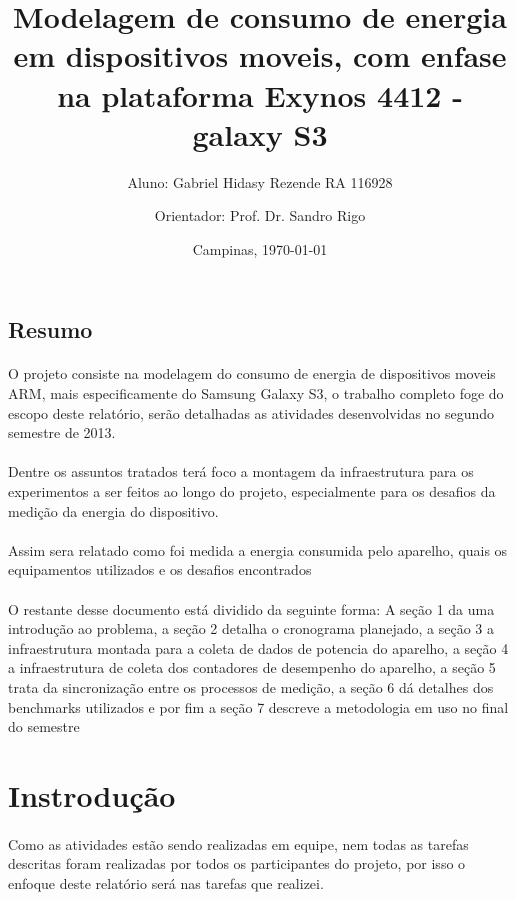 \documentclass[11pt,a4paper,titlepage]{article}
\title{Modelagem de consumo de energia em dispositivos moveis, com enfase na plataforma Exynos 4412 - galaxy S3}
\author{Aluno: Gabriel Hidasy Rezende RA 116928 \and Orientador: Prof. Dr. Sandro Rigo}
\date{Campinas, \today}
\begin{document}
\maketitle

\tableofcontents
\newpage

\begin{center}
\section*{Resumo}
\end{center}
\paragraph{} O projeto consiste na modelagem do consumo de energia de dispositivos moveis ARM, mais especificamente do Samsung Galaxy S3, o trabalho completo foge do escopo deste relatório, serão detalhadas as atividades desenvolvidas no segundo semestre de 2013.
\paragraph{} Dentre os assuntos tratados terá foco a montagem da infraestrutura para os experimentos a ser feitos ao longo do projeto, especialmente para os desafios da medição da energia do dispositivo.
\paragraph{} Assim sera relatado como foi medida a energia consumida pelo aparelho, quais os equipamentos utilizados e os desafios encontrados
\paragraph{} O restante desse documento está dividido da seguinte forma: A seção 1 da uma introdução ao problema, a seção 2 detalha o cronograma planejado, a seção 3 a infraestrutura montada para a coleta de dados de potencia do aparelho, a seção 4 a infraestrutura de coleta dos contadores de desempenho do aparelho, a seção 5 trata da sincronização entre os processos de medição, a seção 6 dá detalhes dos benchmarks utilizados e por fim a seção 7 descreve a metodologia em uso no final do semestre
\newpage
\section{Instrodução}
\paragraph{} Como as atividades estão sendo realizadas em equipe, nem todas as tarefas descritas foram realizadas por todos os participantes do projeto, por isso o enfoque deste relatório será nas tarefas que realizei.
\end{document}
